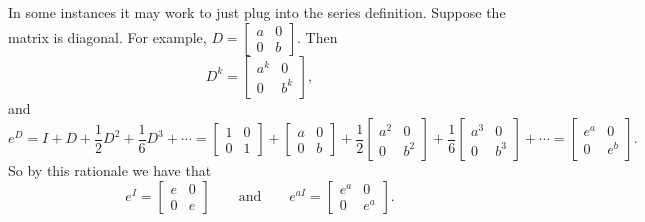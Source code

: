 \documentclass[12pt]{book}
\begin{document}
In some instances it may work to just plug into the series definition.
Suppose the matrix is diagonal.
For example,
$D = \left[ \begin{smallmatrix} a & 0 \\ 0 & b \end{smallmatrix} \right]$.
Then 
\begin{equation*}
D^k = \begin{bmatrix} a^k & 0 \\ 0 & b^k \end{bmatrix} ,
\end{equation*}
and
\begin{equation*}
e^D =
I + D + \frac{1}{2} D^2 + 
\frac{1}{6} D^3 + \cdots
=
\begin{bmatrix} 1 & 0 \\ 0 & 1 \end{bmatrix} +
\begin{bmatrix} a & 0 \\ 0 & b \end{bmatrix} +
\frac{1}{2}
\begin{bmatrix} a^2 & 0 \\ 0 & b^2 \end{bmatrix} +
\frac{1}{6}
\begin{bmatrix} a^3 & 0 \\ 0 & b^3 \end{bmatrix} + \cdots
=
\begin{bmatrix} e^a & 0 \\ 0 & e^b \end{bmatrix} .
\end{equation*}
So by this rationale we have that
\begin{equation*}
e^I = \begin{bmatrix} e & 0\\ 0 & e \end{bmatrix}
\qquad \text{and} \qquad
e^{aI} = \begin{bmatrix} e^a & 0\\ 0 & e^a \end{bmatrix}.
\end{equation*}
\end{document}

